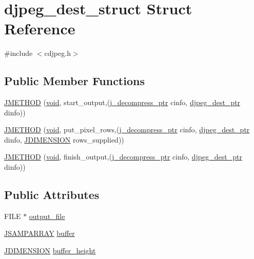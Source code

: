 \hypertarget{structdjpeg__dest__struct}{}\section{djpeg\+\_\+dest\+\_\+struct Struct Reference}
\label{structdjpeg__dest__struct}


{\ttfamily \#include $<$cdjpeg.\+h$>$}

\subsection*{Public Member Functions}
\begin{DoxyCompactItemize}
\item 
\hyperlink{structdjpeg__dest__struct_a387aad15333be251b9fdd4f341e3b50c}{J\+M\+E\+T\+H\+O\+D} (\hyperlink{png_8h_aa8c59027f9ab2769342f248709d68d17}{void}, start\+\_\+output,(\hyperlink{jpeglib_8h_a00c7d78af44bd26a901c791ccfc1e178}{j\+\_\+decompress\+\_\+ptr} cinfo, \hyperlink{cdjpeg_8h_a4afbdda7131a0491992b8e1e9069b518}{djpeg\+\_\+dest\+\_\+ptr} dinfo))
\item 
\hyperlink{structdjpeg__dest__struct_ab7452265598106468aeb73b63c080024}{J\+M\+E\+T\+H\+O\+D} (\hyperlink{png_8h_aa8c59027f9ab2769342f248709d68d17}{void}, put\+\_\+pixel\+\_\+rows,(\hyperlink{jpeglib_8h_a00c7d78af44bd26a901c791ccfc1e178}{j\+\_\+decompress\+\_\+ptr} cinfo, \hyperlink{cdjpeg_8h_a4afbdda7131a0491992b8e1e9069b518}{djpeg\+\_\+dest\+\_\+ptr} dinfo, \hyperlink{jmorecfg_8h_a04ed4674f6f1d0d50ec241531e38274f}{J\+D\+I\+M\+E\+N\+S\+I\+O\+N} rows\+\_\+supplied))
\item 
\hyperlink{structdjpeg__dest__struct_a3a1f7c965ea1dbbb577eb8902e3c893e}{J\+M\+E\+T\+H\+O\+D} (\hyperlink{png_8h_aa8c59027f9ab2769342f248709d68d17}{void}, finish\+\_\+output,(\hyperlink{jpeglib_8h_a00c7d78af44bd26a901c791ccfc1e178}{j\+\_\+decompress\+\_\+ptr} cinfo, \hyperlink{cdjpeg_8h_a4afbdda7131a0491992b8e1e9069b518}{djpeg\+\_\+dest\+\_\+ptr} dinfo))
\end{DoxyCompactItemize}
\subsection*{Public Attributes}
\begin{DoxyCompactItemize}
\item 
F\+I\+L\+E $\ast$ \hyperlink{structdjpeg__dest__struct_a5cd2d9d83c2b0b77b30169be5682d8fc}{output\+\_\+file}
\item 
\hyperlink{jpeglib_8h_ac9d5d1b829ed51769db69a37271a7e91}{J\+S\+A\+M\+P\+A\+R\+R\+A\+Y} \hyperlink{structdjpeg__dest__struct_a84d1443492d9c70afae65d6f95410cf4}{buffer}
\item 
\hyperlink{jmorecfg_8h_a04ed4674f6f1d0d50ec241531e38274f}{J\+D\+I\+M\+E\+N\+S\+I\+O\+N} \hyperlink{structdjpeg__dest__struct_a78eef05ab5286600c995e9df51acf2c1}{buffer\+\_\+height}
\end{DoxyCompactItemize}


